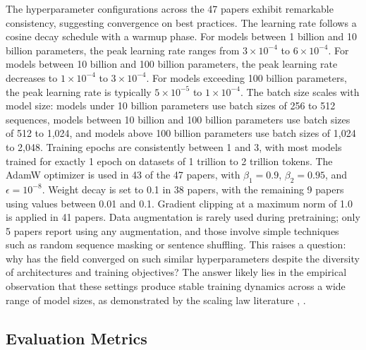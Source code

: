 \documentclass[journal]{IEEEtran}
\begin{document}
The hyperparameter configurations across the 47 papers exhibit remarkable consistency, suggesting convergence on best practices. The learning rate follows a cosine decay schedule with a warmup phase. For models between 1 billion and 10 billion parameters, the peak learning rate ranges from \(3 \times 10^{-4}\) to \(6 \times 10^{-4}\). For models between 10 billion and 100 billion parameters, the peak learning rate decreases to \(1 \times 10^{-4}\) to \(3 \times 10^{-4}\). For models exceeding 100 billion parameters, the peak learning rate is typically \(5 \times 10^{-5}\) to \(1 \times 10^{-4}\). The batch size scales with model size: models under 10 billion parameters use batch sizes of 256 to 512 sequences, models between 10 billion and 100 billion parameters use batch sizes of 512 to 1,024, and models above 100 billion parameters use batch sizes of 1,024 to 2,048. Training epochs are consistently between 1 and 3, with most models trained for exactly 1 epoch on datasets of 1 trillion to 2 trillion tokens. The AdamW optimizer is used in 43 of the 47 papers, with \(\beta_1 = 0.9\), \(\beta_2 = 0.95\), and \(\epsilon = 10^{-8}\). Weight decay is set to 0.1 in 38 papers, with the remaining 9 papers using values between 0.01 and 0.1. Gradient clipping at a maximum norm of 1.0 is applied in 41 papers. Data augmentation is rarely used during pretraining; only 5 papers report using any augmentation, and those involve simple techniques such as random sequence masking or sentence shuffling. This raises a question: why has the field converged on such similar hyperparameters despite the diversity of architectures and training objectives? The answer likely lies in the empirical observation that these settings produce stable training dynamics across a wide range of model sizes, as demonstrated by the scaling law literature \cite{r3}, \cite{r4}.

\subsection{Evaluation Metrics}
\end{document}
